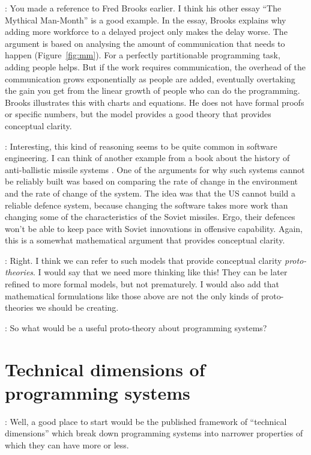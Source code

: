 \documentclass[runningheads]{llncs}
\newcommand{\T}{Tomas}
\newcommand{\J}{Joel}
\newcommand{\says}[2][gg]{\vspace{0.5em}\noindent\hangindent=0.5cm{\textsc{#1}}: #2}
\begin{document}
\says[\J]{You made a reference to Fred Brooks earlier. I think his other essay ``The Mythical Man-Month'' \cite{brooks-1975-manmonth} is a good example. In the essay, Brooks explains why adding more workforce to a delayed project only makes the delay worse. The argument is based on analysing the amount of communication that needs to happen (Figure~\ref{fig:mm}). For a perfectly partitionable programming task, adding people helps. But if the work requires communication, the overhead of the communication grows exponentially as people are added, eventually overtaking the gain you get from the linear growth of people who can do the programming. Brooks illustrates this with charts and equations. He does not have formal proofs or specific numbers, but the model provides a good theory that provides conceptual clarity.}

\says[\T]{Interesting, this kind of reasoning seems to be quite common in software engineering. I can think of another example from a book about the history of anti-ballistic missile systems \cite{slayton-2013-arguments}. One of the arguments for why such systems cannot be reliably built was based on comparing the rate of change in the environment and the rate of change of the system. The idea was that the US cannot build a reliable defence system, because changing the software takes more work than changing some of the characteristics of the Soviet missiles. Ergo, their defences won't be able to keep pace with Soviet innovations in offensive capability. Again, this is a somewhat mathematical argument that provides conceptual clarity.}

\says[\J]{Right. I think we can refer to such models that provide conceptual clarity \emph{proto-theories}. I would say that we need more thinking like this! They can be later refined to more formal models, but not prematurely. I would also add that mathematical formulations like those above are not the only kinds of proto-theories we should be creating.}

\says[\T]{So what would be a useful proto-theory about programming systems?}

\section{Technical dimensions of programming systems}

\says[\J]{Well, a good place to start would be the published framework of ``technical dimensions''
\cite{jakubovic-2023-techdims} which break down programming systems into narrower properties of which they can have more or less.}
\end{document}
